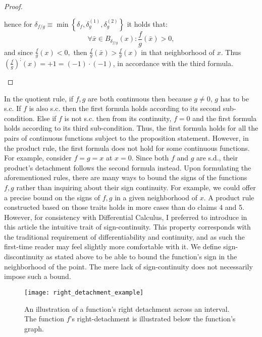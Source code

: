 \documentclass[11pt]{book}
\begin{document}
\begin{proof}
\begin{enumerate}
\begin{itemize}
hence for $\delta_{f/g}\equiv\min\left\{ \delta_{f},\delta_{g}^{\left(1\right)},\delta_{g}^{\left(2\right)}\right\} $ it holds that:
$$\forall\bar{x}\in B_{\delta_{f/g}}\left(x\right):\frac{f}{g}\left(\bar{x}\right)>0,$$
and since $\frac{f}{g}\left(x\right)<0,$ then $\frac{f}{g}\left(\bar{x}\right)>\frac{f}{g}\left(x\right)$ in that neighborhood of $x$. Thus $\left(\frac{f}{g}\right)^{;}\left(x\right)=+1=\left(-1\right)\cdot\left(-1\right)$, in accordance with the third formula.
\end{itemize}
\end{enumerate}
\end{proof}

\begin{remark}In the quotient rule, if $f,g$ are both continuous then because $g\neq0$, $g$ has to be s.c. If $f$ is also s.c. then the first formula holds according to its second sub-condition. Else if $f$ is not s.c. then from its continuity, $f=0$ and the first formula holds according to its third sub-condition. Thus, the first formula holds for all the pairs of continuous functions subject to the proposition statement. However, in the product rule, the first formula does not hold for some continuous functions. For example, consider $f=g=x$ at $x=0$. Since both $f$ and $g$ are s.d., their product's detachment follows the second formula instead.
Upon formulating the aforementioned rules, there are many ways to bound the signs of the functions $f,g$ rather than inquiring about their sign continuity. For example, we could offer a precise bound on the signs of $f,g$ in a given neighborhood of $x$. A product rule constructed based on those traits holds in more cases than do claims 4 and 5. However, for consistency with Differential Calculus,  I preferred to introduce in this article the intuitive trait of sign-continuity. This property corresponds with the traditional requirement of differentiability and continuity, and as such the first-time reader may feel slightly more comfortable with it.
We define sign-discontinuity as stated above to be able to bound the function's sign in the neighborhood of the point. The mere lack of sign-continuity does not necessarily impose such a bound.
\end{remark}

\begin{figure}[h!]
\texttt{[image: right\_detachment\_example]}
\caption{An illustration of a function's right detachment across an interval. The function $f$'s right-detachment is illustrated below the function's graph.}
\end{figure}
\end{document}

